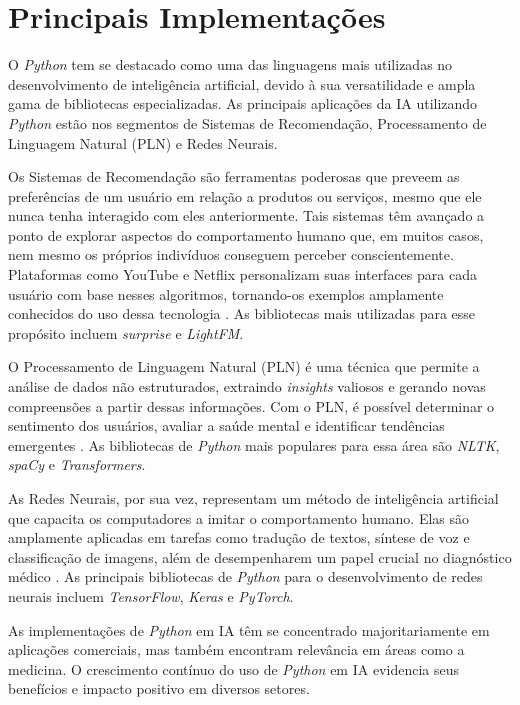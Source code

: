 \section{Principais Implementações}

O \textit{Python} tem se destacado como uma das linguagens mais utilizadas no desenvolvimento de inteligência artificial, devido à sua versatilidade e ampla gama de bibliotecas especializadas. As principais aplicações da IA utilizando \textit{Python} estão nos segmentos de Sistemas de Recomendação, Processamento de Linguagem Natural (PLN) e Redes Neurais.

Os Sistemas de Recomendação são ferramentas poderosas que preveem as preferências de um usuário em relação a produtos ou serviços, mesmo que ele nunca tenha interagido com eles anteriormente. Tais sistemas têm avançado a ponto de explorar aspectos do comportamento humano que, em muitos casos, nem mesmo os próprios indivíduos conseguem perceber conscientemente. Plataformas como YouTube e Netflix personalizam suas interfaces para cada usuário com base nesses algoritmos, tornando-os exemplos amplamente conhecidos do uso dessa tecnologia \cite{didatica2024}. As bibliotecas mais utilizadas para esse propósito incluem \textit{surprise} e \textit{LightFM}.

O Processamento de Linguagem Natural (PLN) é uma técnica que permite a análise de dados não estruturados, extraindo \textit{insights} valiosos e gerando novas compreensões a partir dessas informações. Com o PLN, é possível determinar o sentimento dos usuários, avaliar a saúde mental e identificar tendências emergentes \cite{google2024}. As bibliotecas de \textit{Python} mais populares para essa área são \textit{NLTK}, \textit{spaCy} e \textit{Transformers}.

As Redes Neurais, por sua vez, representam um método de inteligência artificial que capacita os computadores a imitar o comportamento humano. Elas são amplamente aplicadas em tarefas como tradução de textos, síntese de voz e classificação de imagens, além de desempenharem um papel crucial no diagnóstico médico \cite{aws2024}. As principais bibliotecas de \textit{Python} para o desenvolvimento de redes neurais incluem \textit{TensorFlow}, \textit{Keras} e \textit{PyTorch}.

As implementações de \textit{Python} em IA têm se concentrado majoritariamente em aplicações comerciais, mas também encontram relevância em áreas como a medicina. O crescimento contínuo do uso de \textit{Python} em IA evidencia seus benefícios e impacto positivo em diversos setores.